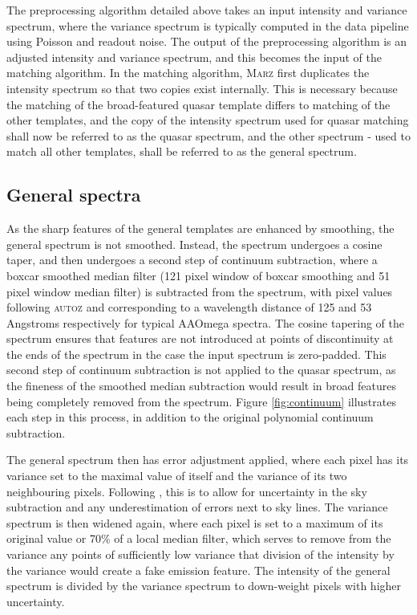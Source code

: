 \documentclass[5p]{elsarticle}
\newcommand{\autoz}{\textsc{autoz}}
\newcommand{\marz}{\textsc{Marz}}
\begin{document}
The preprocessing algorithm detailed above takes an input intensity and variance spectrum, where the variance spectrum is typically computed in the data pipeline using Poisson and readout noise. The output of the preprocessing algorithm is an adjusted intensity and variance spectrum, and this becomes the input of the matching algorithm. In the matching algorithm, \marz{} first duplicates the intensity spectrum so that two copies exist internally. This is necessary because the matching of the broad-featured quasar template differs to matching of the other templates, and the copy of the intensity spectrum used for quasar matching shall now be referred to as the quasar spectrum, and the other spectrum - used to match all other templates, shall be referred to as the general spectrum.

\subsection{General spectra}

As the sharp features of the general templates are enhanced by smoothing, the general spectrum is not smoothed. Instead, the spectrum undergoes a cosine taper, and then undergoes a second step of continuum subtraction, where a boxcar smoothed median filter (121 pixel window of boxcar smoothing and 51 pixel window median filter) is subtracted from the spectrum, with pixel values following \autoz{} and corresponding to a wavelength distance of 125 and 53 Angstroms respectively for typical AAOmega spectra. The cosine tapering of the spectrum ensures that features are not introduced at points of discontinuity at the ends of the spectrum in the case the input spectrum is zero-padded.  This second step of continuum subtraction is not applied to the quasar spectrum, as the fineness of the smoothed median subtraction would result in broad features being completely removed from the spectrum. Figure \ref{fig:continuum} illustrates each step in this process, in addition to the original polynomial continuum subtraction.

The general spectrum then has error adjustment applied, where each pixel has its variance set to the maximal value of itself and the variance of its two neighbouring pixels. Following \citet{baldry2014galaxy}, this is to allow for uncertainty in the sky subtraction and any underestimation of errors next to sky lines. The variance spectrum is then widened again, where each pixel is set to a maximum of its original value or 70\% of a local median filter, which serves to remove from the variance any points of sufficiently low variance that division of the intensity by the variance would create a fake emission feature.  The intensity of the general spectrum is divided by the variance spectrum to down-weight pixels with higher uncertainty. 
\end{document}
